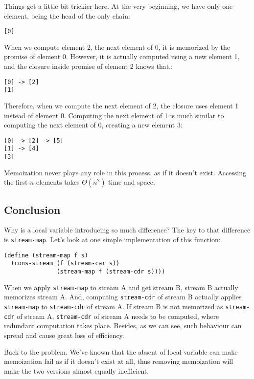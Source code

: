 \documentclass[../main.tex]{subfiles}
\begin{document}
Things get a little bit trickier here. At the very beginning, we have only one element, being the head of the only chain:

\begin{lstlisting}
[0]
\end{lstlisting}

When we compute element 2, the next element of 0, it is memorized by the promise of element 0. However, it is actually computed using a new element 1, and the closure inside promise of element 2 knows that.:

\begin{lstlisting}
[0] -> [2]
[1]
\end{lstlisting}

Therefore, when we compute the next element of 2, the closure uses element 1 instead of element 0. Computing the next element of 1 is much similar to computing the next element of 0, creating a new element 3:

\begin{lstlisting}
[0] -> [2] -> [5]
[1] -> [4]
[3]
\end{lstlisting}

Memoization never plays any role in this process, as if it doesn't exist. Accessing the first $n$ elements takes $\Theta (n^2)$ time and space.

\subsection{Conclusion}

Why is a local variable introducing so much difference? The key to that difference is \lstinline{stream-map}. Let's look at one simple implementation of this function:

\begin{lstlisting}
(define (stream-map f s)
  (cons-stream (f (stream-car s))
               (stream-map f (stream-cdr s))))
\end{lstlisting}

When we apply \lstinline{stream-map} to stream A and get stream B, stream B actually memorizes stream A. And, computing \lstinline{stream-cdr} of stream B actually applies \lstinline{stream-map} to \lstinline{stream-cdr} of stream A. If stream B is not memorized as \lstinline{stream-cdr} of stream A, \lstinline{stream-cdr} of stream A needs to be computed, where redundant computation takes place. Besides, as we can see, such behaviour can spread and cause great loss of efficiency.

Back to the problem. We've known that the absent of local variable can make memoization fail as if it doesn't exist at all, thus removing memoization will make the two versions almost equally inefficient.
\end{document}
